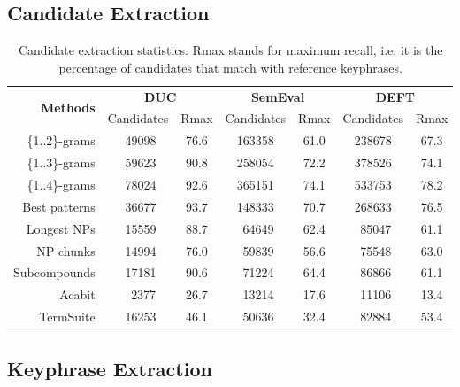   \subsection{Candidate Extraction}
  \label{subsec:candidate_extraction}

    \begin{table}[h]
      \centering
      \begin{tabular}{rcccccc}
        \toprule
        \multirow{2}{*}[-2pt]{\textbf{Methods}} & \multicolumn{2}{c}{\textbf{DUC}} & \multicolumn{2}{c}{\textbf{SemEval}} & \multicolumn{2}{c}{\textbf{DEFT}}\\
        \cmidrule(r){2-3}\cmidrule(lr){4-5}\cmidrule(l){6-7}
        & Candidates & Rmax & Candidates & Rmax & Candidates & Rmax\\
        \midrule
        \{1..2\}-grams & $~~$49098 & 76.6 & 163358 & 61.0 & 238678 & 67.3\\
        \{1..3\}-grams & $~~$59623 & 90.8 & 258054 & 72.2 & 378526 & 74.1\\
        \{1..4\}-grams & $~~$78024 & 92.6 & 365151 & 74.1 & 533753 & 78.2\\
        Best patterns & $~~$36677 & 93.7 & 148333 & 70.7 & 268633 & 76.5\\
        Longest NPs & $~~$15559 & 88.7 & $~~$64649 & 62.4 & $~~$85047 & 61.1\\
        NP chunks & $~~$14994 & 76.0 & $~~$59839 & 56.6 & $~~$75548 & 63.0\\
        Subcompounds & $~~$17181 & 90.6 & $~~$71224 & 64.4 & $~~$86866 & 61.1\\
        Acabit & $~~~~$2377 & 26.7 & $~~$13214 & 17.6 & $~~$11106 & 13.4\\
        TermSuite & $~~$16253 & 46.1 & $~~$50636 & 32.4 & $~~$82884 & 53.4\\
        \bottomrule
      \end{tabular}
      \caption{Candidate extraction statistics. Rmax stands for maximum recall,
               i.e. it is the percentage of candidates that match with reference
               keyphrases. \label{tab:candidate_extraction_statistics}}
    \end{table}


  \subsection{Keyphrase Extraction}
  \label{subsec:keyphrase_extraction}

